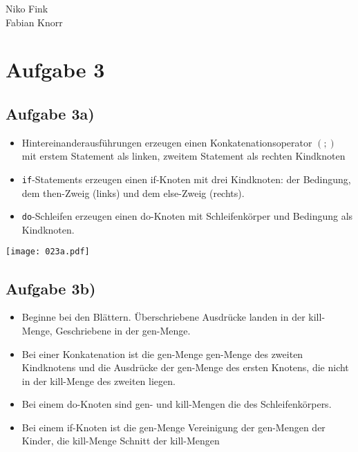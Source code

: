 \documentclass[a4paper,10pt]{article}
\begin{document}
\begin{flushright}
    Niko Fink\\
    Fabian Knorr
\end{flushright}
\vspace*{-5.5em}

\section*{Aufgabe 3}
\subsection*{Aufgabe 3a)}

\begin{itemize}
    \item Hintereinanderausführungen erzeugen einen Konkatenationsoperator $(;)$ mit
        erstem Statement als linken, zweitem Statement als rechten Kindknoten
    \item \texttt{if}-Statements erzeugen einen if-Knoten mit drei Kindknoten:
        der Bedingung, dem then-Zweig (links) und dem else-Zweig (rechts).
    \item \texttt{do}-Schleifen erzeugen einen do-Knoten mit Schleifenkörper und
        Bedingung als Kindknoten.
\end{itemize}

\begin{center}
    \texttt{[image: 023a.pdf]}
\end{center}

\newpage
\subsection*{Aufgabe 3b)}

\begin{itemize}
    \item Beginne bei den Blättern. Überschriebene Ausdrücke landen in der kill-Menge,
        Geschriebene in der gen-Menge.
    \item Bei einer Konkatenation ist die gen-Menge gen-Menge des zweiten Kindknotens
        und die Ausdrücke der gen-Menge des ersten Knotens, die nicht in der kill-Menge
        des zweiten liegen.
    \item Bei einem do-Knoten sind gen- und kill-Mengen die des Schleifenkörpers.
    \item Bei einem if-Knoten ist die gen-Menge Vereinigung der gen-Mengen der Kinder,
        die kill-Menge Schnitt der kill-Mengen
\end{itemize}
\end{document}
